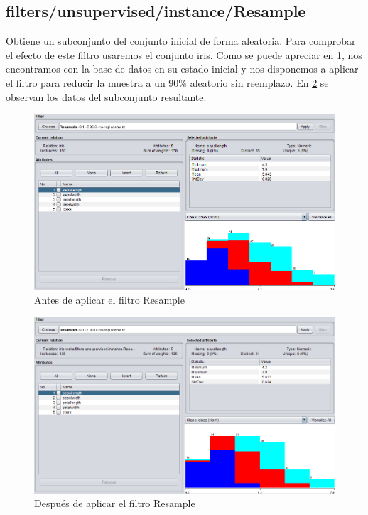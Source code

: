 \documentclass[11pt,twoside,a4paper]{book}
\begin{document}
\subsection{filters/unsupervised/instance/Resample}
Obtiene un subconjunto del conjunto inicial de forma aleatoria.
Para comprobar el efecto de este filtro usaremos el conjunto iris. Como se puede apreciar en \ref{Fig19}, nos encontramos con la base de datos en su estado inicial y nos disponemos a aplicar el filtro para reducir la muestra a un 90\% aleatorio sin reemplazo. En \ref{Fig20} se observan los datos del subconjunto resultante.

\begin{figure}[H]
   \includegraphics[width=\textwidth]{Resample1.png}
	\caption{Antes de aplicar el filtro Resample}
	\label{Fig19}
\end{figure}
\begin{figure}[H]
   \includegraphics[width=\textwidth]{Resample2.png}
	\caption{Después de aplicar el filtro Resample}
	\label{Fig20}
\end{figure}
\end{document}
